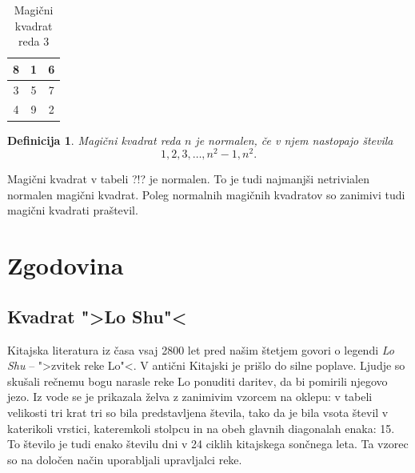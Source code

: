 \documentclass[a4paper,12pt]{article}
\newtheorem{definicija}{Definicija}
\newcommand{\pojem}[1]{\emph{\color{purple}#1}}
\begin{document}
  
  \begin{table}
    \centering
    \caption{Magični kvadrat reda 3}
    \label{table:mag3}
    \begin{tabular}{|c|c|c|}\hline
       8 & 1 & 6 \\\hline
       3 & 5 & 7 \\\hline
       4 & 9 & 2 \\\hline
    \end{tabular}
  \end{table}

\begin{definicija}
   Magični kvadrat reda $n$ je \pojem{normalen}, če v njem nastopajo števila
   \begin{equation}
      \label{eq:numbers}
      1, 2, 3, \ldots, n^2-1, n^2.
   \end{equation}
\end{definicija}

Magični kvadrat v tabeli ?!? je normalen.
To je tudi najmanjši netrivialen normalen magični kvadrat.
Poleg normalnih magičnih kvadratov so zanimivi tudi magični kvadrati praštevil.


\section{Zgodovina}

\subsection{Kvadrat ">Lo Shu"<}

Kitajska literatura iz časa vsaj 2800 let pred našim štetjem govori o legendi
\pojem{Lo Shu} -- ">zvitek reke Lo"<. V antični Kitajski je prišlo do
silne poplave. Ljudje so skušali rečnemu bogu narasle reke Lo ponuditi daritev,
da bi pomirili njegovo jezo. Iz vode se je prikazala želva z zanimivim vzorcem
na oklepu: v tabeli velikosti tri krat tri so bila predstavljena števila, tako
da je bila vsota števil v katerikoli vrstici, kateremkoli stolpcu in na obeh
glavnih diagonalah enaka: 15. To število je tudi enako številu dni v 24 ciklih
kitajskega sončnega leta. Ta vzorec so na določen način uporabljali upravljalci
reke.

\end{document}
